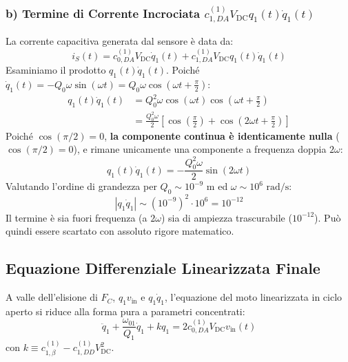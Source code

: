 \documentclass[11pt,a4paper]{article}
\begin{document}
\subsubsection{b) Termine di Corrente Incrociata \texorpdfstring{$c_{1,DA}^{(1)} V_{\text{DC}} q_1(t) \dot{q}_1(t)$}{c1DA VDC q1 q1dot}}
La corrente capacitiva generata dal sensore è data da:
\begin{equation}
    i_S(t) = c_{0,DA}^{(1)} V_{\text{DC}} \dot{q}_1(t) + c_{1,DA}^{(1)} V_{\text{DC}} q_1(t) \dot{q}_1(t)
\end{equation}
Esaminiamo il prodotto $q_1(t) \dot{q}_1(t)$. Poiché $\dot{q}_1(t) = -Q_0 \omega \sin(\omega t) = Q_0 \omega \cos\left(\omega t + \frac{\pi}{2}\right)$:
\begin{align}
    q_1(t) \dot{q}_1(t) &= Q_0^2 \omega \cos(\omega t) \cos\left(\omega t + \frac{\pi}{2}\right) \nonumber \\
    &= \frac{Q_0^2 \omega}{2} \left[ \cos\left(\frac{\pi}{2}\right) + \cos\left(2\omega t + \frac{\pi}{2}\right) \right]
\end{align}
Poiché $\cos(\pi/2) = 0$, \textbf{la componente continua è identicamente nulla} ($\cos(\pi/2) = 0$), e rimane unicamente una componente a frequenza doppia $2\omega$:
\begin{equation}
    q_1(t) \dot{q}_1(t) = -\frac{Q_0^2 \omega}{2} \sin(2\omega t)
\end{equation}
Valutando l'ordine di grandezza per $Q_0 \sim 10^{-9}\text{ m}$ ed $\omega \sim 10^6\text{ rad/s}$:
$$\left| q_1 \dot{q}_1 \right| \sim (10^{-9})^2 \cdot 10^6 = 10^{-12}$$
Il termine è sia fuori frequenza (a $2\omega$) sia di ampiezza trascurabile ($10^{-12}$). Può quindi essere scartato con assoluto rigore matematico.

\subsection{Equazione Differenziale Linearizzata Finale}
A valle dell'elisione di $F_C$, $q_1 v_{\text{in}}$ e $q_1 \dot{q}_1$, l'equazione del moto linearizzata in ciclo aperto si riduce alla forma pura a parametri concentrati:
\begin{equation}
    \ddot{q}_1 + \frac{\omega_{01}}{Q_1} \dot{q}_1 + k q_1 = 2 c_{0,DA}^{(1)} V_{\text{DC}} v_{\text{in}}(t)
    \label{eq:pmut_linear_final}
\end{equation}
con $k \equiv c_{1,\beta}^{(1)} - c_{1,DD}^{(1)} V_{\text{DC}}^2$.

\newpage
\end{document}
